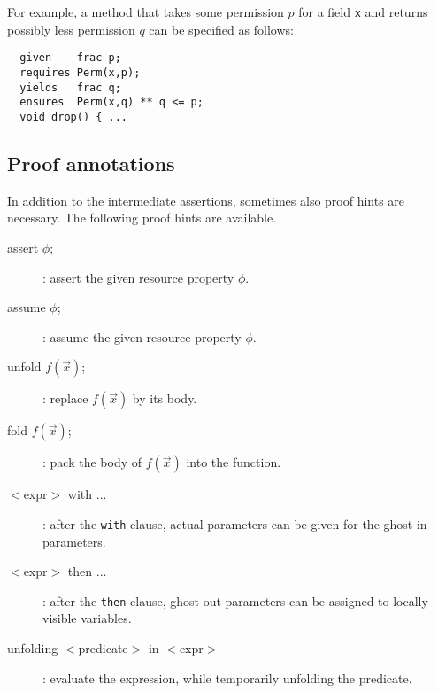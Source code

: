 For example, a method that takes some permission $p$ for a field \lstinline+x+
and returns possibly less permission $q$ can be specified as follows:
\begin{lstlisting}
  given    frac p;
  requires Perm(x,p);
  yields   frac q;
  ensures  Perm(x,q) ** q <= p;
  void drop() { ...
\end{lstlisting}

\subsection{Proof annotations}

In addition to the intermediate assertions, sometimes also proof hints
are necessary. The following proof hints are available.

\begin{description}
\item[assert $\phi$;]: assert the given resource property $\phi$.
\item[assume $\phi$;]: assume the given resource property $\phi$.
\item[unfold $f(\vec x)$;]: replace $f(\vec x)$ by its body.
\item[fold $f(\vec x)$;]: pack the body of $f(\vec x)$ into the
  function.
\item[\(<\)expr\(>\) with { ... }]: after the \lstinline+with+ clause,
  actual parameters can be given for the ghost in-parameters.  
\item[\(<\)expr\(>\) then { ... }]: after the \lstinline+then+ clause,
  ghost out-parameters can be assigned to locally visible variables.
\item[unfolding \(<\)predicate\(>\) in \(<\)expr\(>\)]: evaluate the expression,
while temporarily unfolding the predicate.
\end{description}


